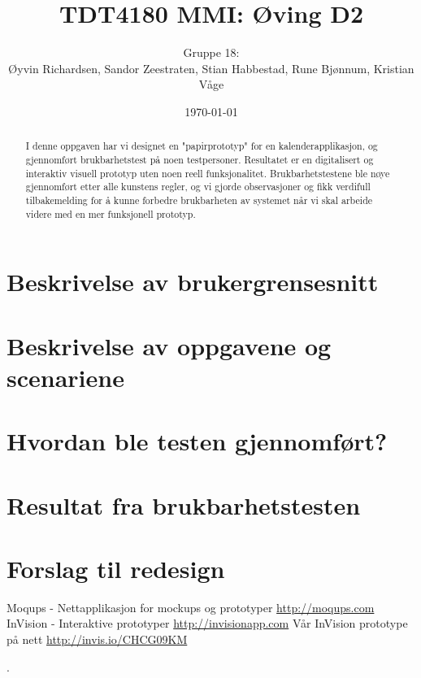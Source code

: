 \documentclass[a4paper,11pt]{article}
\title{TDT4180 MMI: Øving D2}
\author{Gruppe 18: \\ Øyvin Richardsen, Sandor Zeestraten, Stian Habbestad, Rune Bjønnum, Kristian Våge}
\date{\today}
\begin{document}
\maketitle
\newpage

\begin{abstract}
I denne oppgaven har vi designet en "papirprototyp" for en kalenderapplikasjon, og gjennomført brukbarhetstest på noen testpersoner. Resultatet er en digitalisert og interaktiv visuell prototyp uten noen reell funksjonalitet. Brukbarhetstestene ble nøye gjennomført etter alle kunstens regler, og vi gjorde observasjoner og fikk verdifull tilbakemelding for å kunne forbedre brukbarheten av systemet når vi skal arbeide videre med en mer funksjonell prototyp.
\end{abstract}

\newpage




\tableofcontents

\newpage

\section{Beskrivelse av brukergrensesnitt}


\section{Beskrivelse av oppgavene og scenariene}


\section{Hvordan ble testen gjennomført?}


\section{Resultat fra brukbarhetstesten}


\section{Forslag til redesign}


\footnotesize{  %
\begin{thebibliography}{N}
 Moqups - Nettapplikasjon for mockups og prototyper \url{http://moqups.com}
 InVision - Interaktive prototyper \url{http://invisionapp.com}
 Vår InVision prototype på nett \url{http://invis.io/CHCG09KM}

\end{thebibliography}.  
}




\end{document}
